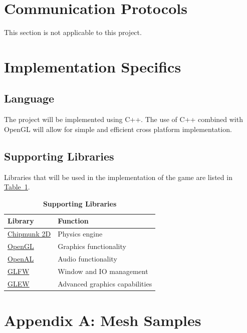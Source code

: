 \documentclass[12pt, titlepage]{article}
\begin{document}
\section{Communication Protocols}
This section is not applicable to this project.

\section{Implementation Specifics}
\subsection{Language}
The project will be implemented using C++.  The use of C++ combined with OpenGL will allow for simple and efficient cross platform implementation.

\subsection{Supporting Libraries}
Libraries that will be used in the implementation of the game are listed in \hyperref[tab:libs]{Table~\ref*{tab:libs}}.

\begin{table}[h]
\caption{\bf Supporting Libraries} \label{tab:libs}
\begin{tabularx}{\textwidth}{p{4cm}X}
\toprule {\bf Library} & {\bf Function}\\
\midrule
\href{https://chipmunk-physics.net/}{Chipmunk 2D} & Physics engine\\
\href{https://www.opengl.org/}{OpenGL} & Graphics functionality\\
\href{https://www.openal.org/}{OpenAL} & Audio functionality\\
\href{https://www.glfw.org/}{GLFW} & Window and IO management\\
\href{http://glew.sourceforge.net/}{GLEW} & Advanced graphics capabilities\\
\bottomrule
\end{tabularx}
\end{table}

\newpage

\section{Appendix A:  Mesh Samples}

\label{sec:app}
\end{document}
